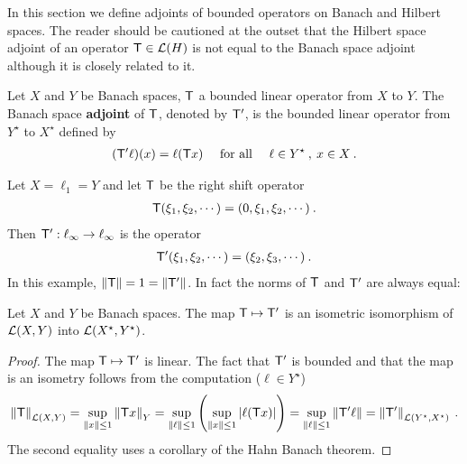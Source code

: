 In this section we define adjoints of bounded operators on Banach and Hilbert spaces. The reader should be cautioned at the outset that the Hilbert space adjoint of an operator $\mathsf{T} \in \mathcal L(H)$ is not equal to the Banach space adjoint although it is closely related to it.

\begin{definition}
    Let $X$ and $Y$ be Banach spaces, $\mathsf{T}$ a bounded linear operator from $X$ to $Y$. The Banach space \textbf{adjoint} of $\mathsf{T}$, denoted by $\mathsf{T}'$, is the bounded linear operator from $Y^\star$ to $X^\star$ defined by
    \begin{align}
        (\mathsf{T}' \ell)(x) = \ell(\mathsf{T} x) \quad \text{ for all } \quad \ell \in Y^\star \:, \: x \in X \:.
    \end{align}
\end{definition}

\begin{example}
    Let $X = \ell_1 = Y$ and let $\mathsf{T}$ be the right shift operator
    \begin{align}
        \mathsf{T} (\xi_1, \xi_2, \cdots) = (0, \xi_1, \xi_2, \cdots) \:.
    \end{align}
    Then $\mathsf{T}' : \ell_\infty \to \ell_\infty$ is the operator
    \begin{align}
        \mathsf{T}'(\xi_1, \xi_2, \cdots) = (\xi_2, \xi_3, \cdots) \:.
    \end{align}
    In this example, $\left \Vert \mathsf{T} \right \Vert = 1 = \left \Vert \mathsf{T}' \right \Vert$. In fact the norms of $\mathsf{T}$ and $\mathsf{T}'$ are always equal:
\end{example}

\begin{theorem}
    Let $X$ and $Y$ be Banach spaces. The map $\mathsf{T} \mapsto \mathsf{T}'$ is an isometric isomorphism of $\mathcal L(X,Y)$ into $\mathcal L(X^\star,Y^\star)$.
\end{theorem}

\begin{proof}
    The map $\mathsf{T} \mapsto \mathsf{T}'$ is linear. The fact that $\mathsf{T}'$ is bounded and that the map is an isometry follows from the computation ($\ell \in Y^\star$)
    \begin{align}
        \left \Vert \mathsf{T} \right \Vert_{\mathcal L(X,Y)} = \sup_{\left \Vert x \right \Vert \leq 1} \left \Vert \mathsf{T} x \right \Vert_Y
        = \sup_{\left \Vert \ell \right \Vert \leq 1} \left( \sup_{\left \Vert x \right \Vert \leq 1} |\ell(\mathsf{T} x)|\right)
        = \sup_{\left \Vert \ell \right \Vert \leq 1} \left \Vert \mathsf{T}' \ell \right \Vert = \left \Vert \mathsf{T}' \right \Vert_{\mathcal L(Y^\star, X^\star)} \:.
    \end{align}
    The second equality uses a corollary of the Hahn Banach theorem.
\end{proof}

